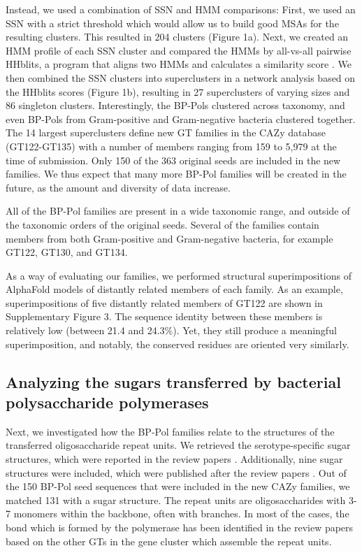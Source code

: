 \documentclass{article}
\begin{document}
Instead, we used a combination of SSN and HMM comparisons: First, we used an SSN with a strict threshold which would allow us to build good MSAs for the resulting clusters. This resulted in 204 clusters (Figure 1a). Next, we created an HMM profile of each SSN cluster and compared the HMMs by all-vs-all pairwise HHblits, a program that aligns two HMMs and calculates a similarity score \cite{remmert_hhblits_2012}. We then combined the SSN clusters into superclusters in a network analysis based on the HHblits scores (Figure 1b), resulting in 27 superclusters of varying sizes and 86 singleton clusters. Interestingly, the BP-Pols clustered across taxonomy, and even BP-Pols from Gram-positive and Gram-negative bacteria clustered together. The 14 largest superclusters define new GT families in the CAZy database (GT122-GT135) with a number of members ranging from 159 to 5,979 at the time of submission. Only 150 of the 363 original seeds are included in the new families. We thus expect that many more BP-Pol families will be created in the future, as the amount and diversity of data increase.

All of the BP-Pol families are present in a wide taxonomic range, and outside of the taxonomic orders of the original seeds. Several of the families contain members from both Gram-positive and Gram-negative bacteria, for example GT122, GT130, and GT134.

As a way of evaluating our families, we performed structural superimpositions of AlphaFold models of distantly related members of each family. As an example, superimpositions of five distantly related members of GT122 are shown in Supplementary Figure 3. The sequence identity between these members is relatively low (between 21.4 and 24.3\%). Yet, they still produce a meaningful superimposition, and notably, the conserved residues are oriented very similarly.

\subsection{Analyzing the sugars transferred by bacterial polysaccharide polymerases}

Next, we investigated how the BP-Pol families relate to the structures of the transferred oligosaccharide repeat units. We retrieved the serotype-specific sugar structures, which were reported in the review papers \cite{liu_structure_2020, liu_structure_2008, liu_structural_2014, kenyon_genetics_2017, islam_synthesis_2014, hu_diversity_2013, bentley_genetic_2006}. Additionally, nine sugar structures were included, which were published after the review papers \cite{li_structural_2019, lin_identification_2013, lin_structure_2014, bush_structures_2015, kondakova_reinvestigation_2008}. Out of the 150 BP-Pol seed sequences that were included in the new CAZy families, we matched 131 with a sugar structure. The repeat units are oligosaccharides with 3-7 monomers within the backbone, often with branches. In most of the cases, the bond which is formed by the polymerase has been identified in the review papers based on the other GTs in the gene cluster which assemble the repeat units.
\end{document}
